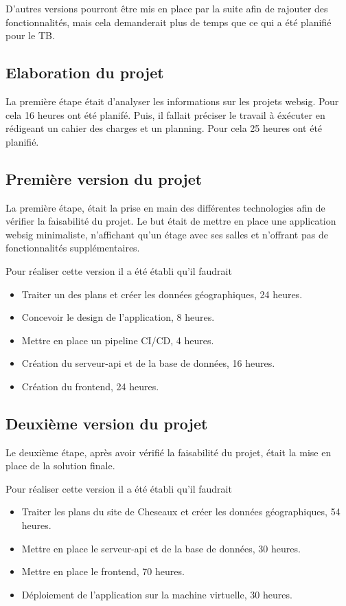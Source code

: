 \documentclass[
    iai, %
    il, %
]{heig-tb}
\begin{document}
D'autres versions pourront être mis en place par la suite afin de rajouter des fonctionnalités,
mais cela demanderait plus de temps que ce qui a été planifié pour le TB.

\subsection{Elaboration du projet}
La première étape était d'analyser les informations sur les projets websig. Pour cela 16 heures ont été planifé.
Puis, il fallait préciser le travail à éxécuter en rédigeant un cahier des charges et un planning. Pour cela 25 heures ont été planifié.

\subsection{Première version du projet}
La première étape, était la prise en main des différentes technologies afin de vérifier la faisabilité du projet.
Le but était de mettre en place une application websig minimaliste, n'affichant qu'un étage avec ses salles et n'offrant pas de fonctionnalités supplémentaires.

Pour réaliser cette version il a été établi qu'il faudrait

\begin{itemize}
    \item Traiter un des plans et créer les données géographiques, 24 heures.
    \item Concevoir le design de l'application, 8 heures.
    \item Mettre en place un pipeline CI/CD, 4 heures.
    \item Création du serveur-api et de la base de données, 16 heures.
    \item Création du frontend, 24 heures.
\end{itemize}

\subsection{Deuxième version du projet}
Le deuxième étape, après avoir vérifié la faisabilité du projet, était la mise en place de la solution finale.


Pour réaliser cette version il a été établi qu'il faudrait

\begin{itemize}
    \item Traiter les plans du site de Cheseaux et créer les données géographiques, 54 heures.
    \item Mettre en place le serveur-api et de la base de données, 30 heures.
    \item Mettre en place le frontend, 70 heures.
    \item Déploiement de l'application sur la machine virtuelle, 30 heures.
\end{itemize}
\end{document}
